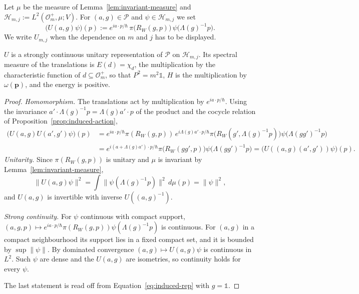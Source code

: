 	\begin{definition}\label{def:induced-rep}
		Let $\mu$ be the measure of Lemma~\ref{lem:invariant-measure} and $\mathcal{H}_{m,j}:=L^2(\mathcal{O}_m^+,\mu;V)$. For $(a,g)\in\mathcal{P}$ and $\psi\in\mathcal{H}_{m,j}$ we set
		\begin{equation}\label{eq:induced-rep}
			\big(U(a,g)\psi\big)(p):=e^{ia\cdot p/\hbar}\,\pi\big(R_W(g,p)\big)\,\psi\big(\Lambda(g)^{-1}p\big).
		\end{equation}
		We write $U_{m,j}$ when the dependence on $m$ and $j$ has to be displayed.
	\end{definition}
	
	\begin{proposition}\label{prop:induced-unitary}
		$U$ is a strongly continuous unitary representation of $\mathcal{P}$ on $\mathcal{H}_{m,j}$. Its spectral measure of the translations is $E(d)=\chi_d$, the multiplication by the characteristic function of $d\subseteq\mathcal{O}_m^+$, so that $P^2=m^2\mathbb{1}$, $H$ is the multiplication by $\omega(\mathbf{p})$, and the energy is positive.
	\end{proposition}
	
	\begin{proof}
		\emph{Homomorphism.} The translations act by multiplication by $e^{ia\cdot p/\hbar}$. Using the invariance $a'\cdot\Lambda(g)^{-1}p=\Lambda(g)a'\cdot p$ of the product and the cocycle relation of Proposition~\ref{prop:induced-action},
		\begin{align*}
			\big(U(a,g)U(a',g')\psi\big)(p)&=e^{ia\cdot p/\hbar}\pi(R_W(g,p))\,e^{i\Lambda(g)a'\cdot p/\hbar}\pi\big(R_W(g',\Lambda(g)^{-1}p)\big)\psi\big(\Lambda(gg')^{-1}p\big)\\
			&=e^{i(a+\Lambda(g)a')\cdot p/\hbar}\pi\big(R_W(gg',p)\big)\psi\big(\Lambda(gg')^{-1}p\big)=\big(U((a,g)(a',g'))\psi\big)(p).
		\end{align*}
		\emph{Unitarity.} Since $\pi(R_W(g,p))$ is unitary and $\mu$ is invariant by Lemma~\ref{lem:invariant-measure},
		\begin{equation*}
			\|U(a,g)\psi\|^2=\int\|\psi(\Lambda(g)^{-1}p)\|^2\,d\mu(p)=\|\psi\|^2,
		\end{equation*}
		and $U(a,g)$ is invertible with inverse $U((a,g)^{-1})$.
		
		\emph{Strong continuity.} For $\psi$ continuous with compact support, $(a,g,p)\mapsto e^{ia\cdot p/\hbar}\pi(R_W(g,p))\psi(\Lambda(g)^{-1}p)$ is continuous. For $(a,g)$ in a compact neighbourhood its support lies in a fixed compact set, and it is bounded by $\sup\|\psi\|$. By dominated convergence $(a,g)\mapsto U(a,g)\psi$ is continuous in $L^2$. Such $\psi$ are dense and the $U(a,g)$ are isometries, so continuity holds for every $\psi$.
		
		The last statement is read off from Equation~\eqref{eq:induced-rep} with $g=\mathbb{1}$.
	\end{proof}
	
